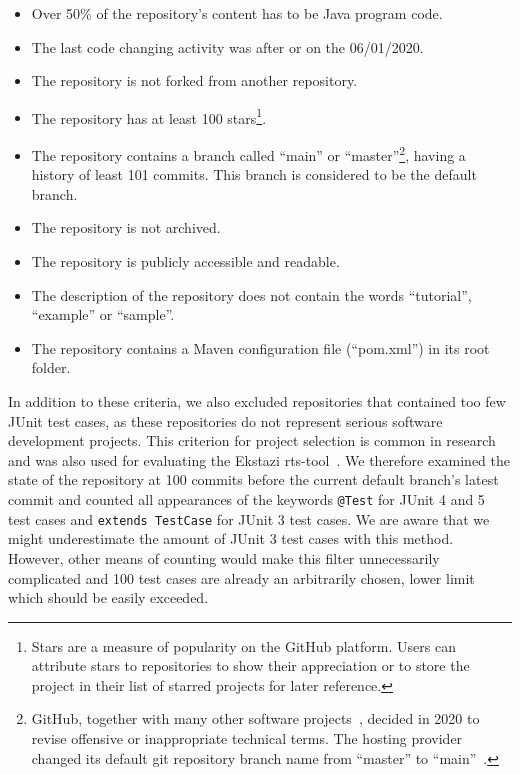\begin{itemize}
    \item Over 50\% of the repository's content has to be Java program code.
    \item The last code changing activity was after or on the 06/01/2020.
    \item The repository is not forked from another repository.
    \item The repository has at least 100 stars\footnote{Stars are a measure of popularity on the GitHub
              platform. Users can attribute stars to repositories to show their appreciation or to store
              the project in their list of starred projects for later reference.}.
    \item The repository contains a branch called ``main'' or ``master''\footnote{GitHub, together with
              many other software projects~\cite{ZDNet_master_main}, decided in 2020 to revise offensive or inappropriate technical terms.
              The hosting provider changed its default git repository branch name from ``master'' to ``main''~\cite{github_main_master}.}, having a history of least 101
          commits. This branch is considered to be the default branch.
    \item The repository is not archived.
    \item The repository is publicly accessible and readable.
    \item The description of the repository does not contain the words ``tutorial'', ``example'' or ``sample''.
    \item The repository contains a Maven configuration file (``pom.xml'') in its root folder.
\end{itemize}

In addition to these criteria, we also excluded repositories that contained too few JUnit test
cases, as these repositories do not represent serious software development projects. This criterion
for project selection is common in research and was also used for evaluating the Ekstazi
\ac{rts}-tool~\cite{ekstazimain}. We therefore
examined the state of the repository at 100 commits before the current default branch's latest commit and counted all
appearances of the keywords \texttt{@Test} for JUnit 4 and 5 test cases and \texttt{extends TestCase} for
JUnit 3 test cases. We are aware that we might underestimate the amount of JUnit 3 test cases with
this method. However, other means of counting would make this filter unnecessarily complicated and 100 test cases
are already an arbitrarily chosen, lower limit which should be easily exceeded.

